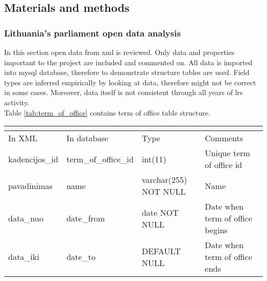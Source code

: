 \documentclass[a4paper,12pt]{article}
\begin{document}
	\clearpage
	
	\subsection{Materials and methods}
   	
 	\subsubsection{Lithuania's parliament open data analysis }
 	
 	In this section open data from \acrshort{xml} is reviewed. Only data and properties important to the project are included and commented on. All data is imported into \gls{mysql} database, therefore to demonstrate structure tables are used. Field types are inferred empirically by looking at data, therefore might not be correct in some cases. Moreover, data itself is not consistent through all years of \acrlong{lrs} activity.\\
	
	\noindent
	Table \ref{tab:term_of_office} contains term of office table structure.
	\begin{center}
	 	\begin{tabular}{L{3cm} L{3cm} L{2.2cm} L{3.8cm}}
	 		\\ 
	 		\hline
	 		In XML & In database & Type & Comments\\
	 		\hline 
	 		kadencijos\_id & term\_of\_office\_id & int(11) & Unique term of office id \\ 
	 		pavadinimas & name & varchar(255) NOT NULL & Name \\
	 		data\_nuo & date\_from & date NOT NULL & Date when term of office begins \\ 
	 		data\_iki & date\_to & DEFAULT NULL & Date when term of office ends \\
	 		\hline
	 	\end{tabular}
	 	 \label{tab:term_of_office}
	\end{center}

	\hfill
	
\end{document}

